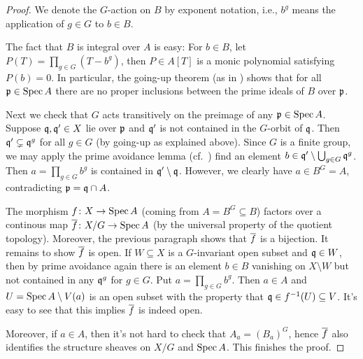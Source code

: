 \documentclass[a4paper,parskip=half,numbers=enddot, DIV=12]{scrreprt}
\begin{document}
\begin{proof}
	We denote the $G$-action on $B$ by exponent notation, i.e., $b^g$ means the application of $g\in G$ to $b\in B$. 
	
	The fact that $B$ is integral over $A$ is easy: For $b\in B$, let $P(T)=\prod_{g\in G}(T-b^g)$, then $P\in A[T]$ is a monic polynomial satisfying $P(b)=0$. In particular, the going-up theorem (as in \cite[Theorem~7]{alg1}) shows that for all $\mathfrak{p}\in \operatorname{Spec} A$ there are no proper inclusions between the prime ideals of $B$ over $\mathfrak{p}$.
	
	Next we check that $G$ acts transitively on the preimage of any $\mathfrak{p}\in\operatorname{Spec} A$. Suppose $\mathfrak{q},\mathfrak{q}'\in X$ lie over $\mathfrak{p}$  and $\mathfrak{q}'$ is not contained in the $G$-orbit of $\mathfrak{q}$. Then $\mathfrak{q}'\subsetneq \mathfrak{q}^g$ for all $g\in G$ (by going-up as explained above). Since $G$ is a finite group, we may apply the prime avoidance lemma (cf.\ \cite[Lemma~2.5.1]{alg1}) find an element $b\in\mathfrak{q}'\setminus \bigcup_{g\in G}\mathfrak{q}^g$. Then $a=\prod_{g\in G}b^g$ is contained in $\mathfrak{q}'\setminus \mathfrak{q}$. However, we clearly have $a\in B^G=A$, contradicting $\mathfrak{p}=\mathfrak{q}\cap A$.
	
	The morphism $f\colon X\morphism\Spec A$ (coming from $A=B^G\subseteq B$) factors over a continous map $\ov{f}\colon X/G\morphism \Spec A$ (by the universal property of the quotient topology). Moreover, the previous paragraph shows that $\overline{f}$ is a bijection. It remains to show $\overline{f}$ is open. If $W\subseteq X$ is a $G$-invariant open subset and $\mathfrak{q}\in W$, then by prime avoidance again there is an element $b\in B$ vanishing on $X\setminus W$ but not contained in any $\mathfrak{q}^g$ for $g\in G$. Put $a=\prod_{g\in G}b^g$. Then $a\in A$ and $U=\operatorname{Spec} A\setminus V(a)$ is an open subset with the property that $\mathfrak{q}\in f^{-1}(U)\subseteq V$. It's easy to see that this implies $\overline{f}$ is indeed open.
	
	Moreover, if $a\in A$, then it's not hard to check that $A_a=(B_a)^G$, hence $\overline{f}$ also identifies the structure sheaves on $X/G$ and $\operatorname{Spec} A$. This finishes the proof.
\end{proof}
\end{document}
